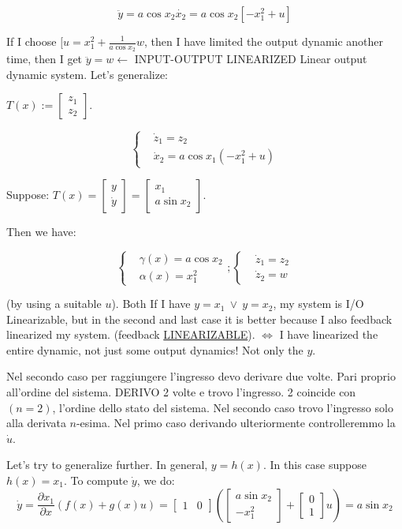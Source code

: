 \[
	\ddot{y} = a\cos{x_2}\dot{x_2} = a\cos{x_2}[-x_1^2 + u]
\]

If I choose $[u = x_1^2 + \frac{1}{a\cos{x_2}}w$, then I have limited the output dynamic another time, then I get $\ddot{y}=w \leftarrow$ INPUT-OUTPUT LINEARIZED Linear output dynamic system. Let's generalize:

$T(x) := \begin{bmatrix}z_1\\z_2\end{bmatrix}$.

\[
	\left\{
	\begin{aligned}
	&\dot{z}_1 = z_2 \\
	&\dot{x}_2 = a\cos{x_1}(-x_1^2 + u)
	\end{aligned}
	\right.
\]	

Suppose: $T(x) = \begin{bmatrix}y\\ \dot{y}\end{bmatrix} = \begin{bmatrix}x_1 \\ a\sin{x_2}\end{bmatrix}$.

Then we have: 

\[
	\left\{
	\begin{aligned}
	&\gamma (x) = a\cos{x_2} \\
	&\alpha (x) = x_1^2
	\end{aligned}
	\right. ; \left\{
	\begin{aligned}
	&\dot{z}_1 = z_2 \\
	&\dot{z}_2 = w
	\end{aligned}
	\right.
\]

(by using a suitable $u$). Both If I have $y=x_1\ \lor\ y=x_2$, my system is I/O Linearizable, but in the second and last case it is better because I also feedback linearized my system. (feedback \underline{LINEARIZABLE}). $\iff$ I have linearized the entire dynamic, not just some output dynamics! Not only the $y$.

Nel secondo caso per raggiungere l'ingresso devo derivare due volte. Pari proprio all'ordine del sistema. DERIVO 2 volte e trovo l'ingresso. 2 coincide con $(n=2)$, l'ordine dello stato del sistema. Nel secondo caso trovo l'ingresso solo alla derivata $n$-esima. Nel primo caso derivando ulteriormente controlleremmo la $\dot{u}$.

Let's try to generalize further.
In general, $y=h(x)$. In this case suppose $h(x)=x_1$. To compute $\dot{y}$, we do:
\[
	\dot{y} = \frac{\partial{x_1}}{\partial{x}}(f(x) + g(x)u) = \begin{bmatrix}1&0\end{bmatrix}(\begin{bmatrix}a\sin{x_2}\\-x_1^2\end{bmatrix} + \begin{bmatrix}0\\1\end{bmatrix}u) = a\sin{x_2}
\]

